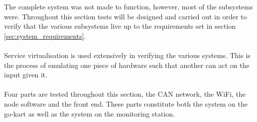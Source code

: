 The complete system was not made to function, however, most of the subsystems were.
Throughout this section tests will be designed and carried out in order to verify that the various subsystems live up to the requirements set in section \ref{sec:system_requirements}.
\\~\\
Service virtualisation is used extensively in verifying the various systems.
This is the process of emulating one piece of hardware such that another can act on the input given it.
\\~\\
Four parts are tested throughout this section, the CAN network, the WiFi, the node software and the front end.
These parts constitute both the system on the go-kart as well as the system on the monitoring station.






